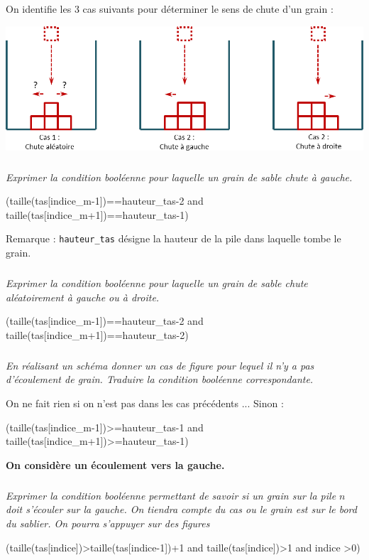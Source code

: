 \documentclass[10pt,fleqn]{article} %
\begin{document}
On identifie les 3 cas suivants pour déterminer le sens de chute d'un grain :
\begin{center}
\includegraphics[width=\linewidth]{images/sablier_03}
\end{center}
\fi

\subparagraph{}
\textit{Exprimer la condition booléenne pour laquelle un grain de sable chute à gauche.}
\ifprof
\begin{corrige}
\begin{python}
(taille(tas[indice_m-1])==hauteur_tas-2 and taille(tas[indice_m+1])==hauteur_tas-1)
\end{python}
Remarque : \texttt{hauteur\_tas} désigne la hauteur de la pile dans laquelle tombe le grain.
\end{corrige}
\else
\fi

\subparagraph{}
\textit{Exprimer la condition booléenne pour laquelle un grain de sable chute aléatoirement à gauche ou à droite.}
\ifprof
\begin{corrige}
\begin{python}
(taille(tas[indice_m-1])==hauteur_tas-2 and taille(tas[indice_m+1])==hauteur_tas-2)
\end{python}
\end{corrige}
\else
\fi

\subparagraph{}
\textit{En réalisant un schéma donner un cas de figure pour lequel il n'y a pas d'écoulement de grain. Traduire la condition booléenne correspondante.}
\ifprof
\begin{corrige}
On ne fait rien si on n'est pas dans les cas précédents ... Sinon : 
\begin{python}
(taille(tas[indice_m-1])>=hauteur_tas-1 and taille(tas[indice_m+1])>=hauteur_tas-1)
\end{python}
\end{corrige}
\else
\fi

\textbf{On considère un écoulement vers la gauche.}

\subparagraph{}
\textit{Exprimer la condition booléenne permettant de savoir si un grain sur la pile $n$ doit s'écouler sur la gauche. On tiendra compte du cas ou le grain est sur le bord du sablier. On pourra s'appuyer sur des figures}
\ifprof
\begin{corrige}
\begin{python}
(taille(tas[indice])>taille(tas[indice-1])+1 and taille(tas[indice])>1 and indice >0)
\end{python}
\end{corrige}
\else
\fi
\end{document}
